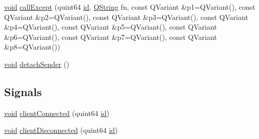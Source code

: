 \begin{DoxyCompactItemize}
\item 
\hyperlink{group___u_a_v_objects_plugin_ga444cf2ff3f0ecbe028adce838d373f5c}{void} \hyperlink{class_qxt_r_p_c_service_a29735715edb6be280733d774d02bb3ab}{call\-Except} (quint64 \hyperlink{glext_8h_a58c2a664503e14ffb8f21012aabff3e9}{id}, \hyperlink{group___u_a_v_objects_plugin_gab9d252f49c333c94a72f97ce3105a32d}{Q\-String} fn, const Q\-Variant \&p1=Q\-Variant(), const Q\-Variant \&p2=Q\-Variant(), const Q\-Variant \&p3=Q\-Variant(), const Q\-Variant \&p4=Q\-Variant(), const Q\-Variant \&p5=Q\-Variant(), const Q\-Variant \&p6=Q\-Variant(), const Q\-Variant \&p7=Q\-Variant(), const Q\-Variant \&p8=Q\-Variant())
\item 
\hyperlink{group___u_a_v_objects_plugin_ga444cf2ff3f0ecbe028adce838d373f5c}{void} \hyperlink{class_qxt_r_p_c_service_a6e9b1bbfe00e384025a58e70fa0e10de}{detach\-Sender} ()
\end{DoxyCompactItemize}
\subsection*{Signals}
\begin{DoxyCompactItemize}
\item 
\hyperlink{group___u_a_v_objects_plugin_ga444cf2ff3f0ecbe028adce838d373f5c}{void} \hyperlink{class_qxt_r_p_c_service_a9b2af33db0cebccc82ecc2b9d21c8843}{client\-Connected} (quint64 \hyperlink{glext_8h_a58c2a664503e14ffb8f21012aabff3e9}{id})
\item 
\hyperlink{group___u_a_v_objects_plugin_ga444cf2ff3f0ecbe028adce838d373f5c}{void} \hyperlink{class_qxt_r_p_c_service_aaaa2a3cb64b4e59dbfefd7c68bf8c305}{client\-Disconnected} (quint64 \hyperlink{glext_8h_a58c2a664503e14ffb8f21012aabff3e9}{id})
\end{DoxyCompactItemize}
